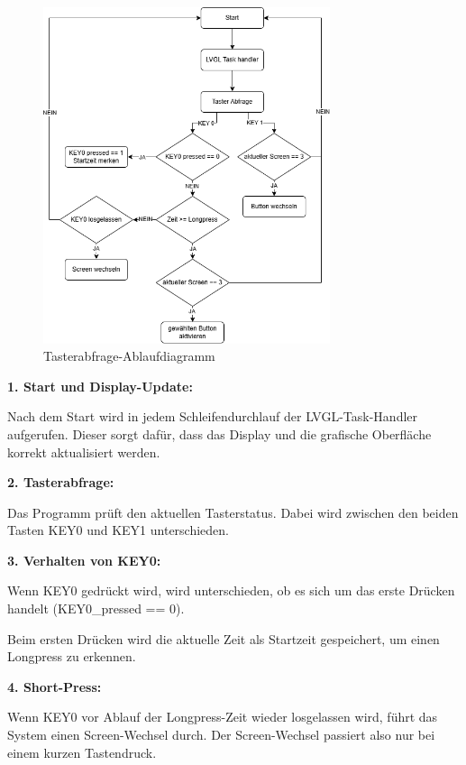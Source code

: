 \begin{inhalt}
\begin{figure}[H]
\centering
\includegraphics[width=0.75\textwidth]{files/Tobias/pics/Diagramme/Tasterabfrage_FInal.png}
\caption[Tasterabfrage-Ablaufdiagramm]{Tasterabfrage-Ablaufdiagramm}
\label{fig:Tasterabfrage-Ablaufdiagramm}
\end{figure}

\textbf{1. Start und Display-Update:}

Nach dem Start wird in jedem Schleifendurchlauf der LVGL-Task-Handler aufgerufen. Dieser sorgt dafür, dass das Display und die grafische Oberfläche korrekt aktualisiert werden.

\textbf{2. Tasterabfrage:}

Das Programm prüft den aktuellen Tasterstatus. Dabei wird zwischen den beiden Tasten KEY0 und KEY1 unterschieden.

\textbf{3. Verhalten von KEY0:}

Wenn KEY0 gedrückt wird, wird unterschieden, ob es sich um das erste Drücken handelt (KEY0\_pressed == 0).

Beim ersten Drücken wird die aktuelle Zeit als Startzeit gespeichert, um einen Longpress zu erkennen.

\textbf{4. Short-Press:}

Wenn KEY0 vor Ablauf der Longpress-Zeit wieder losgelassen wird, führt das System einen Screen-Wechsel durch. Der Screen-Wechsel passiert also nur bei einem kurzen Tastendruck.


\end{inhalt}
